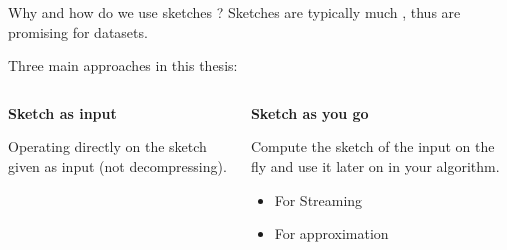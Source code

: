 \begin{frame}{Why and how do we use sketches ?}
    Sketches are typically much , thus are promising for  datasets.
    
    \bigskip
    \pause


    \hspace{-0.5cm} {\large \textcolor{black!30!blue}{Three main approaches in this thesis:}}\\
    \begin{columns}
        \begin{framed}
            \begin{center}
                \textbf{Sketch as input}
            \end{center}
            Operating directly on the sketch given as input (not decompressing).
        \end{framed}
        \begin{framed}
            \begin{center}
                \textbf{Sketch as you go}
            \end{center}
            Compute the sketch of the input on the fly and use it later on in your algorithm. 
            \begin{itemize}
                \item For Streaming
                \item For approximation
            \end{itemize}
        \end{framed}
    \end{columns}
\end{frame}
